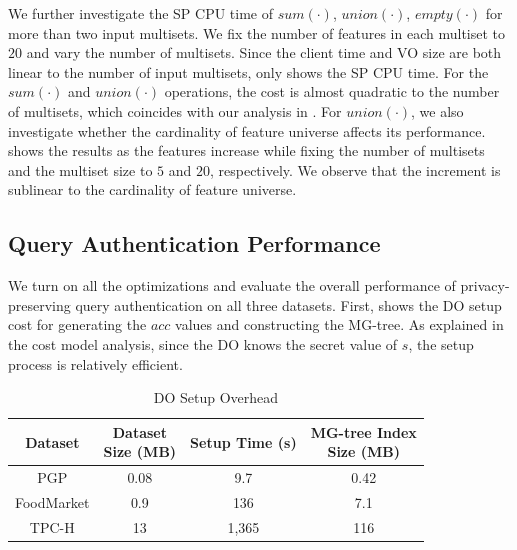 We further investigate the SP CPU time of $sum(\cdot)$, $union(\cdot)$, $empty(\cdot)$ for more than two input multisets. We fix the number of features in each multiset to $20$ and vary the number of multisets. Since the client time and VO size are both linear to the number of input multisets,  only shows the SP CPU time. For the $sum(\cdot)$ and $union(\cdot)$ operations, the cost is almost quadratic to the number of multisets, which coincides with our analysis in . For $union(\cdot)$, we also investigate whether the cardinality of feature universe affects its performance.  shows the results as the features increase while fixing the number of multisets and the multiset size to $5$ and $20$, respectively. We observe that the increment is sublinear to the cardinality of feature universe.

\subsection{Query Authentication Performance}

We turn on all the optimizations and evaluate the overall performance of privacy-preserving query authentication on all three datasets. First,  shows the DO setup cost for generating the $acc$ values and constructing the MG-tree. As explained in the cost model analysis, since the DO knows the secret value of $s$, the setup process is relatively efficient.

\begin{table}[t]
  \centering
  \footnotesize
  \begin{tabular}{cccc}
    \toprule
    Dataset & \tabincell{c}{Dataset\\ Size (MB)} & {Setup Time (s)} & \tabincell{c}{MG-tree Index\\Size (MB)} \\
    \midrule
    PGP  & 0.08 & 9.7 & 0.42 \\
    FoodMarket & 0.9 & 136 & 7.1 \\
    TPC-H & 13 & 1,365 & 116 \\
    \bottomrule
  \end{tabular}
  \caption{DO Setup Overhead}\label{tab:aggregate-queries:setup}
\end{table}

